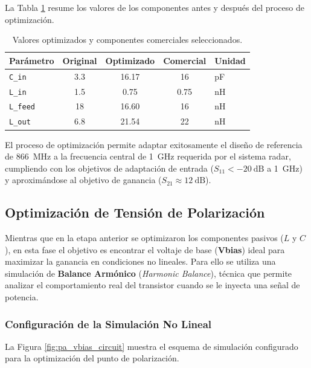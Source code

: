 La Tabla \ref{tab:pa_opt_values} resume los valores de los componentes antes y después del proceso de optimización.

\begin{table}[htbp]
\centering
\small
\caption{Valores optimizados y componentes comerciales seleccionados.}
\label{tab:pa_opt_values}
\begin{tabular}{@{}lcccl@{}}
\toprule
\textbf{Parámetro} & \textbf{Original} & \textbf{Optimizado} & \textbf{Comercial} & \textbf{Unidad} \\
\midrule
\texttt{C\_in}   & 3.3   & 16.17  & 16    & pF \\
\texttt{L\_in}   & 1.5   & 0.75   & 0.75  & nH \\
\texttt{L\_feed} & 18    & 16.60  & 16    & nH \\
\texttt{L\_out}  & 6.8   & 21.54  & 22    & nH \\
\bottomrule
\end{tabular}
\end{table}

El proceso de optimización permite adaptar exitosamente el diseño de referencia de \qty{866}{\MHz} a la frecuencia central de \qty{1}{\GHz} requerida por el sistema radar, cumpliendo con los objetivos de adaptación de entrada ($S_{11} < \qty{-20}{\dB}$ a \qty{1}{\GHz}) y aproximándose al objetivo de ganancia ($S_{21} \approx \qty{12}{\dB}$).

\subsection{Optimización de Tensión de Polarización}

Mientras que en la etapa anterior se optimizaron los componentes pasivos ($L$ y $C$), en esta fase el objetivo es encontrar el voltaje de base (\textbf{Vbias}) ideal para maximizar la ganancia en condiciones no lineales. Para ello se utiliza una simulación de \textbf{Balance Armónico} (\textit{Harmonic Balance}), técnica que permite analizar el comportamiento real del transistor cuando se le inyecta una señal de potencia.

\subsubsection{Configuración de la Simulación No Lineal}

La Figura \ref{fig:pa_vbias_circuit} muestra el esquema de simulación configurado para la optimización del punto de polarización.

